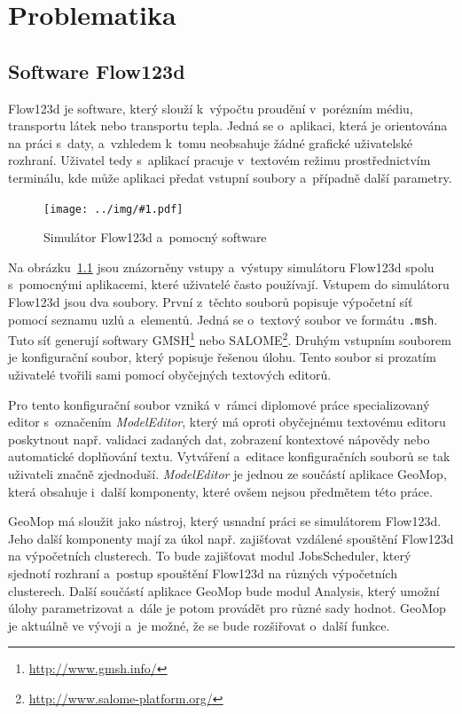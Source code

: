 \documentclass[FM,bw,DP]{tulthesis}
\newcommand{\includeimg}[2]{%
\begin{figure}[h]
	\centering
    \texttt{[image: ../img/\#1.pdf]}
    \caption{#2}
	\label{img:#1}
\end{figure}
}
\begin{document}


\chapter{Problematika}

\section{Software Flow123d}

Flow123d je software, který slouží k~výpočtu proudění v~porézním médiu, transportu látek nebo transportu tepla. Jedná se o~aplikaci, která je orientována na práci s~daty, a~vzhledem k~tomu neobsahuje žádné grafické uživatelské rozhraní. Uživatel tedy s~aplikací pracuje v~textovém režimu prostřednictvím terminálu, kde může aplikaci předat vstupní soubory a~případně další parametry.

\includeimg{flow123d}{Simulátor Flow123d a~pomocný software}

Na obrázku~\ref{img:flow123d} jsou znázorněny vstupy a~výstupy simulátoru Flow123d spolu s~pomocnými aplikacemi, které uživatelé často používají. Vstupem do simulátoru Flow123d jsou dva soubory. První z~těchto souborů popisuje výpočetní síť pomocí seznamu uzlů a~elementů. Jedná se o~textový soubor ve formátu \texttt{.msh}. Tuto síť generují softwary GMSH\footnote{\url{http://www.gmsh.info/}} nebo SALOME\footnote{\url{http://www.salome-platform.org/}}. Druhým vstupním souborem je konfigurační soubor, který popisuje řešenou úlohu. Tento soubor si prozatím uživatelé tvořili sami pomocí obyčejných textových editorů.

Pro tento konfigurační soubor vzniká v~rámci diplomové práce specializovaný editor s~označením \textit{ModelEditor}, který má oproti obyčejnému textovému editoru poskytnout např. validaci zadaných dat, zobrazení kontextové nápovědy nebo automatické doplňování textu. Vytváření a~editace konfiguračních souborů se tak uživateli značně zjednoduší. \textit{ModelEditor} je jednou ze součástí aplikace GeoMop, která obsahuje i~další komponenty, které ovšem nejsou předmětem této práce.

GeoMop má sloužit jako nástroj, který usnadní práci se simulátorem Flow123d. Jeho další komponenty mají za úkol např. zajišťovat vzdálené spouštění Flow123d na výpočetních clusterech. To bude zajišťovat modul JobsScheduler, který sjednotí rozhraní a~postup spouštění Flow123d na různých výpočetních clusterech. Další součástí aplikace GeoMop bude modul Analysis, který umožní úlohy parametrizovat a~dále je potom provádět pro různé sady hodnot. GeoMop je aktuálně ve vývoji a~je možné, že se bude rozšiřovat o~další funkce. 
\end{document}
